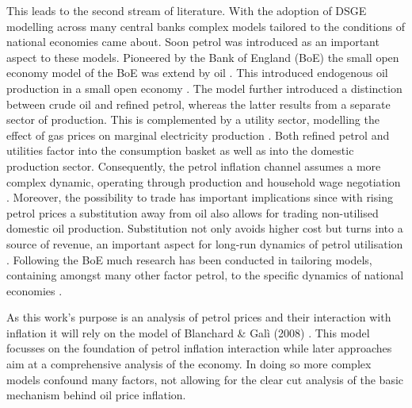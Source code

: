 \documentclass[12pt,a4paper,english]{article} %
\begin{document}
	This leads to the second stream of literature. With the adoption of DSGE modelling across many central banks complex models tailored to the conditions of national economies came about. Soon petrol was introduced as an important aspect to these models. Pioneered by the Bank of England (BoE) the small open economy model of the BoE was extend by oil \cite{harrison_evaluating_2010, harrison_impact_2011}. This introduced endogenous oil production in a small open economy \cite{harrison_impact_2011}. The model further introduced a distinction between crude oil and refined petrol, whereas the latter results from a separate sector of production. This is complemented by a utility sector, modelling the effect of gas prices on marginal electricity production \cite{harrison_impact_2011}. Both refined petrol and utilities factor into the consumption basket as well as into the domestic production sector. Consequently, the petrol inflation channel assumes a more complex dynamic, operating through production and household wage negotiation \cite{harrison_impact_2011}. Moreover, the possibility to trade has important implications since with rising petrol prices a substitution away from oil also allows for trading non-utilised domestic oil production. Substitution not only avoids higher cost but turns into a source of revenue, an important aspect for long-run dynamics of petrol utilisation \cite{harrison_impact_2011}. Following the BoE much research has been conducted in tailoring models, containing amongst many other factor petrol, to the specific dynamics of national economies \cite{lees_introducing_2009, malakhovskaya_are_2014, hou_oil_2016}. 
	
	As this work's purpose is an analysis of petrol prices and their interaction with inflation it will rely on the model of Blanchard \& Galì (2008) \cite{blanchard_macroeconomic_2007}. This model focusses on the foundation of petrol inflation interaction while later approaches aim at a comprehensive analysis of the economy. In doing so more complex models confound many factors, not allowing for the clear cut analysis of the basic mechanism behind oil price inflation.
	
\end{document}

